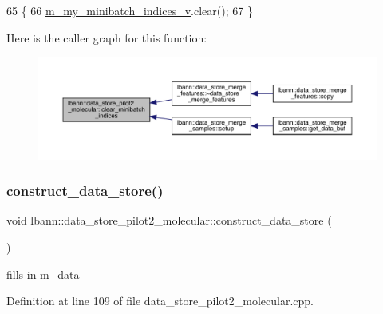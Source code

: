 \begin{DoxyCode}
65                                  \{
66     \hyperlink{classlbann_1_1generic__data__store_a41f7fec1f1f3d6568a5765be7a6784eb}{m\_my\_minibatch\_indices\_v}.clear();
67   \}
\end{DoxyCode}
Here is the caller graph for this function\+:\nopagebreak
\begin{figure}[H]
\begin{center}
\leavevmode
\includegraphics[width=350pt]{classlbann_1_1data__store__pilot2__molecular_a246274b369ed60bf214cf503019ab2ca_icgraph}
\end{center}
\end{figure}
\mbox{\label{classlbann_1_1data__store__pilot2__molecular_a8021fa0a93e39c9d43de6ecc2d72e14e}} 
\subsubsection{\texorpdfstring{construct\+\_\+data\+\_\+store()}{construct\_data\_store()}}
{\footnotesize\ttfamily void lbann\+::data\+\_\+store\+\_\+pilot2\+\_\+molecular\+::construct\+\_\+data\+\_\+store (\begin{DoxyParamCaption}{ }\end{DoxyParamCaption})\hspace{0.3cm}{\ttfamily [protected]}}



fills in m\+\_\+data 



Definition at line 109 of file data\+\_\+store\+\_\+pilot2\+\_\+molecular.\+cpp.


